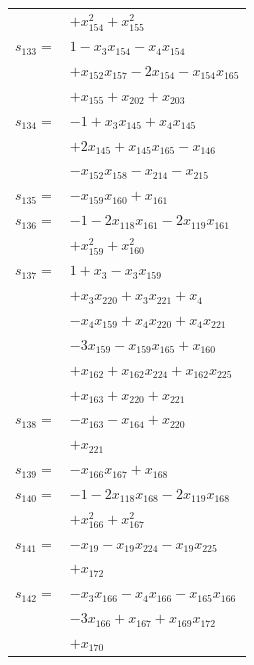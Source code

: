 \begin{longtable}{@{}r@{\;}l@{}}
 & \(\displaystyle +x_{154}^{2} +x_{155}^{2}\) \\[3pt]
\(s_{133}=\) & \(\displaystyle 1 -x_{3}x_{154} -x_{4}x_{154}\) \\
 & \(\displaystyle +x_{152}x_{157} -2x_{154} -x_{154}x_{165}\) \\
 & \(\displaystyle +x_{155} +x_{202} +x_{203}\) \\[3pt]
\(s_{134}=\) & \(\displaystyle -1 +x_{3}x_{145} +x_{4}x_{145}\) \\
 & \(\displaystyle +2x_{145} +x_{145}x_{165} -x_{146}\) \\
 & \(\displaystyle -x_{152}x_{158} -x_{214} -x_{215}\) \\[3pt]
\(s_{135}=\) & \(\displaystyle -x_{159}x_{160} +x_{161}\) \\[3pt]
\(s_{136}=\) & \(\displaystyle -1 -2x_{118}x_{161} -2x_{119}x_{161}\) \\
 & \(\displaystyle +x_{159}^{2} +x_{160}^{2}\) \\[3pt]
\(s_{137}=\) & \(\displaystyle 1 +x_{3} -x_{3}x_{159}\) \\
 & \(\displaystyle +x_{3}x_{220} +x_{3}x_{221} +x_{4}\) \\
 & \(\displaystyle -x_{4}x_{159} +x_{4}x_{220} +x_{4}x_{221}\) \\
 & \(\displaystyle -3x_{159} -x_{159}x_{165} +x_{160}\) \\
 & \(\displaystyle +x_{162} +x_{162}x_{224} +x_{162}x_{225}\) \\
 & \(\displaystyle +x_{163} +x_{220} +x_{221}\) \\[3pt]
\(s_{138}=\) & \(\displaystyle -x_{163} -x_{164} +x_{220}\) \\
 & \(\displaystyle +x_{221}\) \\[3pt]
\(s_{139}=\) & \(\displaystyle -x_{166}x_{167} +x_{168}\) \\[3pt]
\(s_{140}=\) & \(\displaystyle -1 -2x_{118}x_{168} -2x_{119}x_{168}\) \\
 & \(\displaystyle +x_{166}^{2} +x_{167}^{2}\) \\[3pt]
\(s_{141}=\) & \(\displaystyle -x_{19} -x_{19}x_{224} -x_{19}x_{225}\) \\
 & \(\displaystyle +x_{172}\) \\[3pt]
\(s_{142}=\) & \(\displaystyle -x_{3}x_{166} -x_{4}x_{166} -x_{165}x_{166}\) \\
 & \(\displaystyle -3x_{166} +x_{167} +x_{169}x_{172}\) \\
 & \(\displaystyle +x_{170}\) \\[3pt]

\end{longtable}
